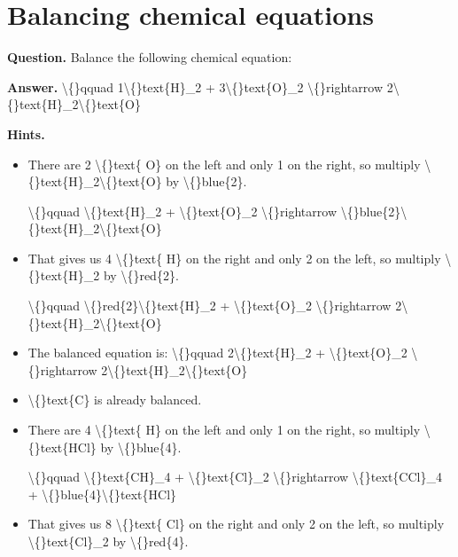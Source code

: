 \documentclass{article}
\begin{document}
\section*{Balancing chemical equations}
\textbf{Question.} Balance the following chemical equation:

\textbf{Answer.} \textbackslash\{\}qquad
                1\textbackslash\{\}text\{H\}\_2 +
                3\textbackslash\{\}text\{O\}\_2 \textbackslash\{\}rightarrow
                2\textbackslash\{\}text\{H\}\_2\textbackslash\{\}text\{O\}

\textbf{Hints.}
\begin{itemize}
  \item There are 2 \textbackslash\{\}text\{ O\} on the left and only
                        1 on the right, so multiply
                        \textbackslash\{\}text\{H\}\_2\textbackslash\{\}text\{O\} by \textbackslash\{\}blue\{2\}.
                    
                    \textbackslash\{\}qquad
                        \textbackslash\{\}text\{H\}\_2 + \textbackslash\{\}text\{O\}\_2 \textbackslash\{\}rightarrow \textbackslash\{\}blue\{2\}\textbackslash\{\}text\{H\}\_2\textbackslash\{\}text\{O\}
  \item That gives us 4 \textbackslash\{\}text\{ H\} on the right and
                        only 2 on the left, so multiply
                        \textbackslash\{\}text\{H\}\_2 by \textbackslash\{\}red\{2\}.
                    
                    \textbackslash\{\}qquad
                        \textbackslash\{\}red\{2\}\textbackslash\{\}text\{H\}\_2 + \textbackslash\{\}text\{O\}\_2 \textbackslash\{\}rightarrow 2\textbackslash\{\}text\{H\}\_2\textbackslash\{\}text\{O\}
  \item The balanced equation is:
                    \textbackslash\{\}qquad
                        2\textbackslash\{\}text\{H\}\_2 + \textbackslash\{\}text\{O\}\_2 \textbackslash\{\}rightarrow 2\textbackslash\{\}text\{H\}\_2\textbackslash\{\}text\{O\}
  \item \textbackslash\{\}text\{C\} is already balanced.
  \item There are 4 \textbackslash\{\}text\{ H\} on the left and only
                        1 on the right, so multiply
                        \textbackslash\{\}text\{HCl\} by \textbackslash\{\}blue\{4\}.
                    
                    \textbackslash\{\}qquad
                        \textbackslash\{\}text\{CH\}\_4 + \textbackslash\{\}text\{Cl\}\_2 \textbackslash\{\}rightarrow \textbackslash\{\}text\{CCl\}\_4 + \textbackslash\{\}blue\{4\}\textbackslash\{\}text\{HCl\}
  \item That gives us 8 \textbackslash\{\}text\{ Cl\} on the right and
                        only 2 on the left, so multiply
                        \textbackslash\{\}text\{Cl\}\_2 by \textbackslash\{\}red\{4\}.
                    

\end{itemize}
\end{document}
